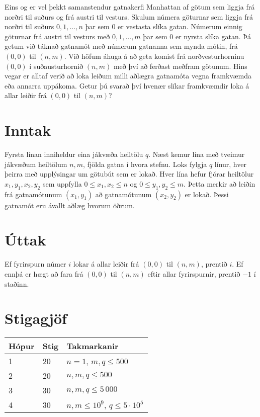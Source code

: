 
Eins og er vel þekkt samanstendur gatnakerfi Manhattan af götum sem liggja frá norðri til suðurs og frá austri til vesturs. Skulum númera
göturnar sem liggja frá norðri til suðurs $0, 1, \dots, n$ þar sem $0$ er vestasta slíka gatan. Númerum einnig göturnar frá austri til
vesturs með $0, 1, \dots, m$ þar sem $0$ er nyrsta slíka gatan. Þá getum við táknað gatnamót með númerum gatnanna sem mynda mótin, frá
$(0, 0)$ til $(n, m)$. Við höfum áhuga á að geta komist frá norðvesturhorninu $(0, 0)$ í suðausturhornið $(n, m)$ með því að ferðast
meðfram götunum. Hins vegar er alltaf
verið að loka leiðum milli aðlægra gatnamóta vegna framkvæmda eða annarra uppákoma. Getur þú svarað því hvenær slíkar framkvæmdir loka 
á allar leiðir frá $(0, 0)$ til $(n, m)$?

\section*{Inntak}
Fyrsta línan inniheldur eina jákvæða heiltölu $q$. Næst kemur lína með tveimur jákvæðum heiltölum $n, m$, fjölda
gatna í hvora stefnu. Loks fylgja $q$ línur, hver þeirra með upplýsingar um götubút sem er lokað. Hver lína hefur fjórar heiltölur
$x_1, y_1, x_2, y_2$ sem uppfylla $0 \leq x_1, x_2 \leq n$ og $0 \leq y_1, y_2 \leq m$. Þetta merkir að leiðin frá gatnamótunum $(x_1, y_1)$
að gatnamótunum $(x_2, y_2)$ er lokað. Þessi gatnamót eru ávallt aðlæg hvorum öðrum. 

\section*{Úttak}
Ef fyrirspurn númer $i$ lokar á allar leiðir frá $(0, 0)$ til $(n, m)$, prentið $i$. Ef ennþá er hægt að fara frá $(0, 0)$ til $(n, m)$ eftir
allar fyrirspurnir, prentið $-1$ í staðinn.

\section*{Stigagjöf}
\begin{tabular}{|l|l|l|}
\hline
Hópur & Stig & Takmarkanir \\ \hline
1     & 20   & $n = 1$, $m, q \leq 500$ \\ \hline
2     & 20   & $n, m, q \leq 500$ \\ \hline
3     & 30   & $n, m, q \leq 5\,000$ \\ \hline
4     & 30   & $n, m \leq 10^9$, $q \leq 5 \cdot 10^5$ \\ \hline
\end{tabular}

